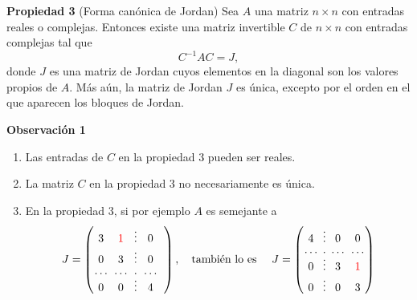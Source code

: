 {\nologo
\begin{frame}%

	\vspace{-2mm}
	\begin{prop}{\textbf{Propiedad 3} (Forma canónica de Jordan)}\justifying
	Sea $A$ una matriz $n\times n$ con entradas reales o complejas. Entonces existe una matriz invertible $C$ de 
	$n\times n$ con entradas complejas tal que
	\[
		C^{-1}AC = J,
	\]
	donde $J$ es una matriz de Jordan cuyos elementos en la diagonal son los valores propios de $A$. 
	Más aún, la matriz de Jordan $J$ es única, excepto por el orden en el que aparecen los bloques de Jordan.
	\end{prop}
	
	\vspace{-1mm}
	\begin{alertblock}{\textbf{Observación 1}}
	
		\begin{enumerate}[$a$]
			\item Las entradas de $C$ en la propiedad 3 pueden ser reales.
			\item La matriz $C$ en la propiedad 3 no necesariamente es única.
			
			\item En la propiedad 3, si por ejemplo $A$ es semejante a
			\[
			J = 
			\left(
			\begin{array}{@{\hspace{0.1\tabcolsep}}c@{\hspace{\tabcolsep}}c@{\hspace{\tabcolsep}}c@{\hspace{\tabcolsep}}c@{\hspace{\tabcolsep}}c@{\hspace{0.1\tabcolsep}}}
			3 & {\color{red}1} & \vdots & 0 \\[0mm]
			0 & 3 & \vdots & 0 \\[-0mm]
			\cdots & \cdots  & \cdot & \cdots \\[-2mm]
			0 & 0 & \vdots & 4 \\
			\end{array}
			\right), 	
			\quad \text{también lo es } \quad 
			J = 
			\left(
			\begin{array}{@{\hspace{0.1\tabcolsep}}c@{\hspace{0.8\tabcolsep}}c@{\hspace{0.8\tabcolsep}}c@{\hspace{\tabcolsep}}c@{\hspace{0.1\tabcolsep}}}
			4 & \vdots & 0 & 0 \\[0mm]
			\cdots & \cdot  & \cdots & \cdots \\[-2mm]
			0 & \vdots & 3 & {\color{red}1} \\[-0mm]		
			0 & \vdots & 0 & 3 \\
			\end{array}
			\right) 	
			\]
		\end{enumerate}
	\end{alertblock}	

\end{frame}
}

